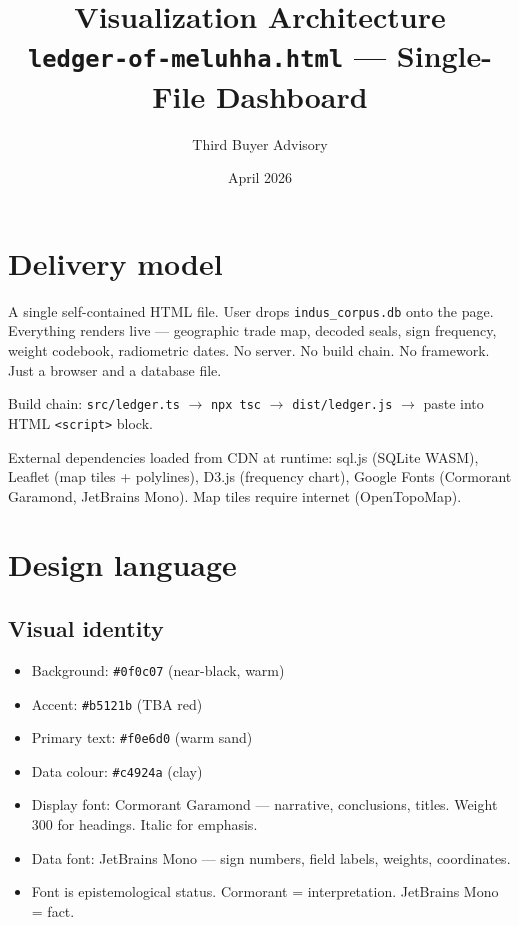 \documentclass[11pt]{article}
\title{\textbf{Visualization Architecture}\\
  \large\texttt{ledger-of-meluhha.html} --- Single-File Dashboard}
\author{Third Buyer Advisory}
\date{April 2026}
\begin{document}
\maketitle

\section{Delivery model}

A single self-contained HTML file. User drops
\texttt{indus\_corpus.db} onto the page. Everything renders
live --- geographic trade map, decoded seals, sign frequency,
weight codebook, radiometric dates. No server. No build chain.
No framework. Just a browser and a database file.

Build chain: \texttt{src/ledger.ts} $\to$ \texttt{npx tsc}
$\to$ \texttt{dist/ledger.js} $\to$ paste into HTML
\texttt{<script>} block.

External dependencies loaded from CDN at runtime:
sql.js (SQLite WASM), Leaflet (map tiles + polylines),
D3.js (frequency chart), Google Fonts (Cormorant Garamond,
JetBrains Mono). Map tiles require internet (OpenTopoMap).

\section{Design language}

\subsection{Visual identity}

\begin{itemize}[nosep]
\item Background: \texttt{\#0f0c07} (near-black, warm)
\item Accent: \texttt{\#b5121b} (TBA red)
\item Primary text: \texttt{\#f0e6d0} (warm sand)
\item Data colour: \texttt{\#c4924a} (clay)
\item Display font: Cormorant Garamond --- narrative,
  conclusions, titles. Weight 300 for headings. Italic for
  emphasis.
\item Data font: JetBrains Mono --- sign numbers, field labels,
  weights, coordinates.
\item Font is epistemological status. Cormorant = interpretation.
  JetBrains Mono = fact.
\end{itemize}
\end{document}
